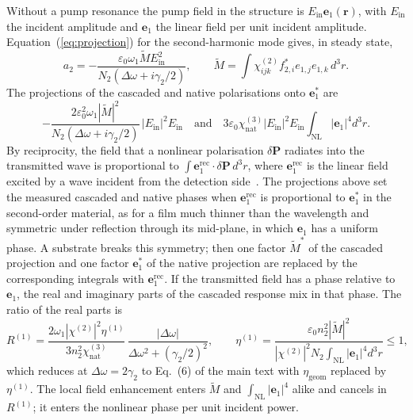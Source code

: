 \documentclass[9pt]{osa-supplemental-document}
\newcommand{\chitwo}{\chi^{(2)}}
\newcommand{\chinat}{\chi^{(3)}_{\mathrm{nat}}}
\newcommand{\Dom}{\Delta\omega}
\newcommand{\etag}{\eta_{\mathrm{geom}}}
\newcommand{\NL}{\mathrm{NL}}
\begin{document}
Without a pump resonance the pump field in the structure is
$E_{\mathrm{in}}\mathbf e_1(\mathbf r)$, with $E_{\mathrm{in}}$ the incident
amplitude and $\mathbf e_1$ the linear field per unit incident amplitude.
Equation~(\ref{eq:projection}) for the second-harmonic mode gives, in
steady state,
\begin{equation}
  a_2=-\frac{\varepsilon_0\omega_1\widetilde M E_{\mathrm{in}}^2}{N_2(\Dom+i\gamma_2/2)},\qquad
  \widetilde M=\int\chitwo_{ijk}f^*_{2,i}e_{1,j}e_{1,k}\,d^3r .
\end{equation}
The projections of the cascaded and native polarisations onto
$\mathbf e_1^*$ are
\begin{equation}
  -\frac{2\varepsilon_0^2\omega_1|\widetilde M|^2}{N_2(\Dom+i\gamma_2/2)}\,|E_{\mathrm{in}}|^2E_{\mathrm{in}}
  \quad\text{and}\quad
  3\varepsilon_0\chinat|E_{\mathrm{in}}|^2E_{\mathrm{in}}\int_{\NL}|\mathbf e_1|^4d^3r .
\end{equation}
By reciprocity, the field that a nonlinear polarisation $\delta\mathbf P$
radiates into the transmitted wave is proportional to
$\int\mathbf e_1^{\mathrm{rec}}\cdot\delta\mathbf P\,d^3r$, where
$\mathbf e_1^{\mathrm{rec}}$ is the linear field excited by a wave incident
from the detection side~\cite{obrien2015}.  The projections above set the
measured cascaded and native phases when $\mathbf e_1^{\mathrm{rec}}$ is
proportional to $\mathbf e_1^*$ in the second-order material, as for a
film much thinner than the wavelength and symmetric under reflection
through its mid-plane, in which $\mathbf e_1$ has a uniform phase.  A
substrate breaks this symmetry; then one factor $\widetilde M^*$ of the
cascaded projection and one factor $\mathbf e_1^*$ of the native projection
are replaced by the corresponding integrals with $\mathbf e_1^{\mathrm{rec}}$.
If the transmitted field has a phase relative to $\mathbf e_1$, the real and
imaginary parts of the cascaded response mix in that phase.  The ratio of
the real parts is
\begin{equation}
  R^{(1)}=\frac{2\omega_1|\chitwo|^2\eta^{(1)}}{3n_2^2\chinat}\,
  \frac{|\Dom|}{\Dom^2+(\gamma_2/2)^2},\qquad
  \eta^{(1)}=\frac{\varepsilon_0n_2^2|\widetilde M|^2}{|\chitwo|^2N_2\int_{\NL}|\mathbf e_1|^4d^3r}\le1,
\end{equation}
which reduces at $\Dom=2\gamma_2$ to Eq.~(6) of the main text with $\etag$
replaced by $\eta^{(1)}$.  The local field enhancement enters $\widetilde M$ and
$\int_{\NL}|\mathbf e_1|^4$ alike and cancels in $R^{(1)}$; it enters the
nonlinear phase per unit incident power.
\end{document}
